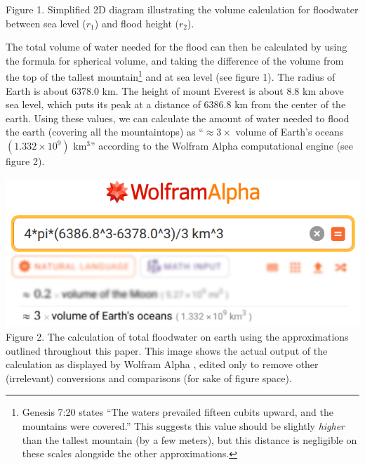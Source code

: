 \documentclass[10pt]{article}
\newenvironment{Figure}
  {\par\medskip\noindent\minipage{\linewidth}}
  {\endminipage\par\medskip}
\begin{document}
\begin{multicols}{2}
\begin{Figure}
	
	{\footnotesize Figure 1. Simplified 2D diagram illustrating the volume calculation for floodwater between sea level ($r_1$) and flood height ($r_2$).}
\end{Figure}

The total volume of water needed for the flood can then be calculated by using the formula for spherical volume, and taking the difference of the volume from the top of the tallest mountain\footnote{Genesis 7:20 states ``The waters prevailed fifteen cubits upward, and the mountains were covered.'' This suggests this value should be slightly \textit{higher} than the tallest mountain (by a few meters), but this distance is negligible on these scales alongside the other approximations.} and at sea level (see figure 1). The radius of Earth is about 6378.0 km. The height of mount Everest is about 8.8 km above sea level, which puts its peak at a distance of 6386.8 km from the center of the earth. Using these values, we can calculate the amount of water needed to flood the earth (covering all the mountaintops) as ``$\approx 3 \times $ volume of Earth's oceans $(1.332 \times 10^9)$ km$^3$'' according to the Wolfram Alpha computational engine (see figure 2).

\begin{Figure}
	\centering
		\includegraphics[width=\textwidth]{wolfram_edited.jpg}
	{\footnotesize Figure 2. The calculation of total floodwater on earth using the approximations outlined throughout this paper. This image shows the actual output of the calculation as displayed by Wolfram Alpha \cite{WolframAlpha}, edited only to remove other (irrelevant) conversions and comparisons (for sake of figure space).}
\end{Figure}


\end{multicols}
\end{document}
